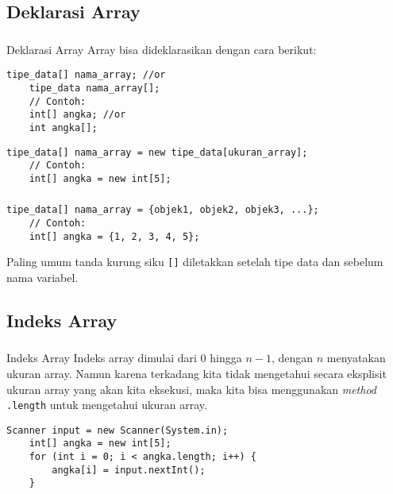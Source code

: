 \documentclass[aspectratio=169]{beamer}
\theoremstyle{definition}
\begin{document}
    \subsection{Deklarasi Array}
    \begin{frame}[fragile]
        \frametitle{\insertsection}
        \framesubtitle{\insertsubsection}
        \begin{block}{Deklarasi Array}
            Array bisa dideklarasikan dengan cara berikut: 
        \end{block}
        \begin{lstlisting}[caption={Inisialisasi variabel array}]
    tipe_data[] nama_array; //or
    tipe_data nama_array[];
    // Contoh:
    int[] angka; //or
    int angka[];
        \end{lstlisting}
        \begin{lstlisting}[caption={Inisialisasi ukuran array}]
    tipe_data[] nama_array = new tipe_data[ukuran_array];
    // Contoh:
    int[] angka = new int[5];
        \end{lstlisting}
    \end{frame}

    \begin{frame}[fragile]
        \frametitle{\insertsection}
        \framesubtitle{\insertsubsection}
        \begin{lstlisting}[caption={Inisialisasi elemen array}]
    tipe_data[] nama_array = {objek1, objek2, objek3, ...};
    // Contoh:
    int[] angka = {1, 2, 3, 4, 5};
        \end{lstlisting}
        Paling umum tanda kurung siku \texttt{[]} diletakkan setelah tipe data dan sebelum nama variabel. 
    \end{frame}

    \subsection{Indeks Array}
    \begin{frame}[fragile]
        \frametitle{\insertsection}
        \framesubtitle{\insertsubsection}
        \begin{block}{Indeks Array}
            Indeks array dimulai dari 0 hingga $n-1$, dengan $n$ menyatakan ukuran array. Namun karena terkadang kita tidak mengetahui secara eksplisit ukuran array yang akan kita eksekusi, maka kita bisa menggunakan \textit{method} \texttt{.length} untuk mengetahui ukuran array.
        \end{block}
        \begin{lstlisting}[caption={Memberi input pada array}]
    Scanner input = new Scanner(System.in);
    int[] angka = new int[5];
    for (int i = 0; i < angka.length; i++) {
        angka[i] = input.nextInt();
    }
        \end{lstlisting}
    \end{frame}
\end{document}
